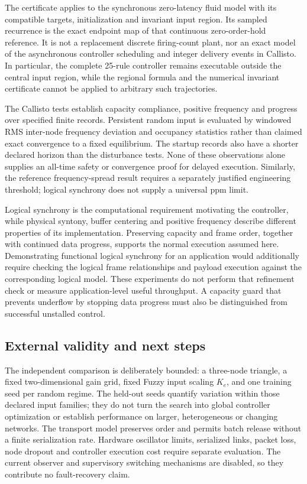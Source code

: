 The certificate applies to the synchronous zero-latency fluid model with
its compatible targets, initialization and invariant input region.
Its sampled recurrence is the exact endpoint map of that continuous
zero-order-hold reference. It is not a replacement discrete firing-count
plant, nor an exact model of the asynchronous controller scheduling
and integer delivery events in Callisto. In particular, the
complete 25-rule controller remains executable outside the central
input region, while the regional formula and the numerical invariant
certificate cannot be applied to arbitrary such trajectories.

The Callisto tests establish capacity compliance, positive frequency and
progress over specified finite records. Persistent random input is
evaluated by windowed RMS inter-node frequency deviation and occupancy statistics rather
than claimed exact convergence to a fixed equilibrium. The startup
records also have a shorter declared horizon than the disturbance
tests. None of these observations alone supplies an all-time safety
or convergence proof for delayed execution. Similarly, the reference
frequency-spread result requires a separately justified engineering
threshold; logical synchrony does not supply a universal ppm limit.

Logical synchrony is the computational requirement motivating the
controller, while physical syntony, buffer centering and positive
frequency describe different properties of its implementation.
Preserving capacity and frame order, together with continued data
progress, supports the normal execution assumed here. Demonstrating
functional logical synchrony for an application would additionally
require checking the logical frame relationships and payload execution
against the corresponding logical model. These experiments do not
perform that refinement check or measure application-level useful
throughput. A capacity guard that prevents underflow by stopping data
progress must also be distinguished from successful unstalled control.

\subsection{External validity and next steps}
\label{detail:subsec:discussion_future}

The independent comparison is deliberately bounded: a three-node
triangle, a fixed two-dimensional gain grid, fixed Fuzzy input scaling
$K_e$, and one training seed per random regime. The held-out seeds
quantify variation within those declared input families; they do not
turn the search into global controller optimization or establish
performance on larger, heterogeneous or changing networks. The
transport model preserves order and permits batch release without a
finite serialization rate. Hardware oscillator limits, serialized
links, packet loss, node dropout and controller execution cost require
separate evaluation. The current observer and supervisory switching
mechanisms are disabled, so they contribute no fault-recovery claim.

